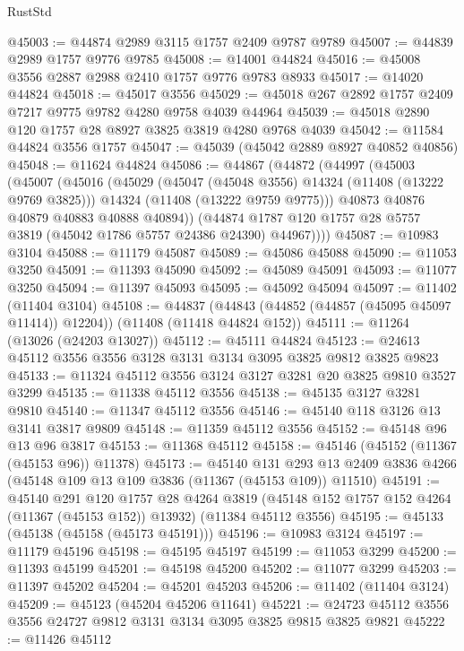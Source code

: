 \begin{lexlean}{RustStd}
\begin{coremodule}
@45003 := @44874 @2989 @3115 @1757 @2409 @9787 @9789
@45007 := @44839 @2989 @1757 @9776 @9785
@45008 := @14001 @44824
@45016 := @45008 @3556 @2887 @2988 @2410 @1757 @9776 @9783 @8933
@45017 := @14020 @44824
@45018 := @45017 @3556
@45029 := @45018 @267 @2892 @1757 @2409 @7217 @9775 @9782 @4280 @9758 @4039 @44964
@45039 := @45018 @2890 @120 @1757 @28 @8927 @3825 @3819 @4280 @9768 @4039
@45042 := @11584 @44824 @3556 @1757
@45047 := @45039 (@45042 @2889 @8927 @40852 @40856)
@45048 := @11624 @44824
@45086 := @44867
    (@44872
      (@44997
        (@45003
          (@45007
            (@45016
              (@45029
                (@45047 (@45048 @3556) @14324 (@11408 (@13222 @9769 @3825)))
                @14324
                (@11408 (@13222 @9759 @9775)))
              @40873
              @40876
              @40879
              @40883
              @40888
              @40894))
          (@44874 @1787 @120 @1757 @28 @5757 @3819 (@45042 @1786 @5757 @24386 @24390) @44967))))
@45087 := @10983 @3104
@45088 := @11179 @45087
@45089 := @45086 @45088
@45090 := @11053 @3250
@45091 := @11393 @45090
@45092 := @45089 @45091
@45093 := @11077 @3250
@45094 := @11397 @45093
@45095 := @45092 @45094
@45097 := @11402 (@11404 @3104)
@45108 := @44837
    (@44843 (@44852 (@44857 (@45095 @45097 @11414)) @12204))
    (@11408 (@11418 @44824 @152))
@45111 := @11264 (@13026 (@24203 @13027))
@45112 := @45111 @44824
@45123 := @24613 @45112 @3556 @3556 @3128 @3131 @3134 @3095 @3825 @9812 @3825 @9823
@45133 := @11324 @45112 @3556 @3124 @3127 @3281 @20 @3825 @9810 @3527 @3299
@45135 := @11338 @45112 @3556
@45138 := @45135 @3127 @3281 @9810
@45140 := @11347 @45112 @3556
@45146 := @45140 @118 @3126 @13 @3141 @3817 @9809
@45148 := @11359 @45112 @3556
@45152 := @45148 @96 @13 @96 @3817
@45153 := @11368 @45112
@45158 := @45146 (@45152 (@11367 (@45153 @96)) @11378)
@45173 := @45140
    @131
    @293
    @13
    @2409
    @3836
    @4266
    (@45148 @109 @13 @109 @3836 (@11367 (@45153 @109)) @11510)
@45191 := @45140
    @291
    @120
    @1757
    @28
    @4264
    @3819
    (@45148 @152 @1757 @152 @4264 (@11367 (@45153 @152)) @13932)
    (@11384 @45112 @3556)
@45195 := @45133 (@45138 (@45158 (@45173 @45191)))
@45196 := @10983 @3124
@45197 := @11179 @45196
@45198 := @45195 @45197
@45199 := @11053 @3299
@45200 := @11393 @45199
@45201 := @45198 @45200
@45202 := @11077 @3299
@45203 := @11397 @45202
@45204 := @45201 @45203
@45206 := @11402 (@11404 @3124)
@45209 := @45123 (@45204 @45206 @11641)
@45221 := @24723 @45112 @3556 @3556 @24727 @9812 @3131 @3134 @3095 @3825 @9815 @3825 @9821
@45222 := @11426 @45112

\end{coremodule}
\end{lexlean}
